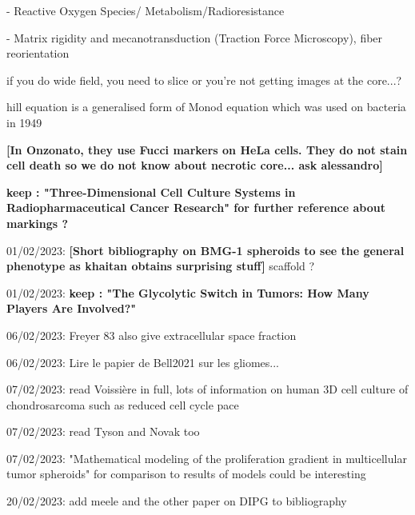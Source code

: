 \documentclass[11pt,a4paper]{article}
\begin{document}
-        Reactive Oxygen Species/ Metabolism/Radioresistance

-        Matrix rigidity and mecanotransduction (Traction Force Microscopy), fiber reorientation

if you do wide field, you need to slice or you're not getting images at the core...?

hill equation is a  generalised form of Monod equation which was used on bacteria in 1949

\textbf{[In Onzonato, they use Fucci markers on HeLa cells. They do not stain cell death so we do not know about necrotic core... ask alessandro]}

\textbf{keep : "Three-Dimensional Cell Culture Systems in Radiopharmaceutical Cancer Research" for further reference about markings ?}

01/02/2023: \textbf{[Short bibliography on  BMG-1 spheroids to see the general phenotype  as khaitan obtains surprising stuff]} scaffold ?

01/02/2023: \textbf{keep : "The Glycolytic Switch in Tumors: How Many Players Are Involved?"}

06/02/2023: Freyer 83 also give extracellular space fraction

06/02/2023: Lire le papier de Bell2021 sur les gliomes...

07/02/2023: read Voissière in full, lots of information on human 3D cell culture of chondrosarcoma such as reduced cell cycle pace

07/02/2023: read Tyson and Novak too

07/02/2023: "Mathematical modeling of the proliferation gradient in multicellular tumor spheroids" for comparison to results of models could be interesting

20/02/2023:  add meele and the other paper on DIPG to bibliography
\newpage


\end{document}
